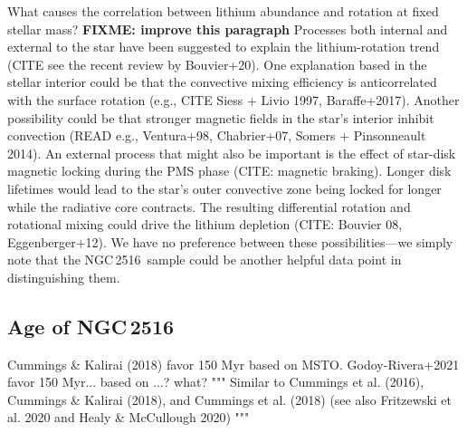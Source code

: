 \documentclass[12pt,twocolumn,tighten]{aastex63}
\newcommand{\cn}{NGC\,2516} %
\begin{document}

What causes the correlation between lithium abundance and rotation at
fixed stellar mass?
{\bf FIXME: improve this paragraph}
Processes both internal and external to the star have been suggested to explain
the lithium-rotation trend (CITE see the recent review by Bouvier+20).
One explanation based in the stellar interior could be that the
convective mixing efficiency is anticorrelated with the surface
rotation (e.g., CITE Siess + Livio 1997, Baraffe+2017).  Another
possibility could be that stronger magnetic fields in the star's
interior inhibit convection (READ e.g., Ventura+98, Chabrier+07,
Somers + Pinsonneault 2014).  An external process that might also be
important is the effect of star-disk magnetic locking during the PMS
phase (CITE: magnetic braking).  Longer disk lifetimes would lead to
the star's outer convective zone being locked for longer while the
radiative core contracts.  The resulting differential rotation and
rotational mixing could drive the lithium depletion (CITE: Bouvier 08,
Eggenberger+12).
We have no preference between these possibilities---we simply note
that the \cn\ sample could be another helpful data point in
distinguishing them.


\subsection{Age of NGC\,2516}
Cummings \& Kalirai (2018) favor 150 Myr based on MSTO.
Godoy-Rivera+2021 favor 150 Myr... based on ...? what?
"""
Similar to Cummings et al. (2016), Cummings \& Kalirai (2018),
and Cummings et al. (2018) (see also Fritzewski et al. 2020 and Healy
\&
McCullough 2020)
"""



% 
% 
\end{document}

